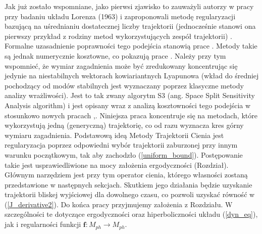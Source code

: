 \documentclass[12pt]{article}
\begin{document}
Jak już zostało wspomniane, jako pierwsi zjawisko to zauważyli autorzy w pracy \cite{Lea1} przy badaniu układu Lorenza (1963) i zaproponowali metodę regularyzacji bazującą na uśrednianiu dostatecznej liczby trajektorii (jednocześnie stanowi ona pierwszy przykład z rodziny metod wykorzystujących zespół trajektorii) \cite{Lea2}. Formalne uzasadnienie poprawności tego podejścia stanowią prace \cite{Ruelle1} . Metody takie są jednak numerycznie kosztowne, co pokazują prace \cite{Chandramoorthy}. Należy przy tym wspomnieć, że wymiar zagadnienia może być zredukowany koncentrując się jedynie na niestabilnych wektorach kowiariantnych Lyapunowa (wkład do średniej pochodzący od modów stabilnych jest wyznaczany poprzez klasyczne metody analizy wrażliwości). Jest to tak zwany algorytm S3 (ang. Space Split Sensitivity Analysis algorithm) i jest opisany wraz z analizą kosztowności tego podejścia w stosunkowo nowych pracach \cite{Chandramoorthy2},\cite{Chandramoorthy3}. Niniejsza praca koncentruje się na metodach, które wykorzystują jedną (generyczną) trajektorię, co od razu wyznacza kres górny wymiaru zagadnienia.\newline 
Podstawową ideą Metody Trajektorii Cienia jest regularyzacja poprzez odpowiedni wybór trajektorii zaburzonej przy innym warunku początkowym, tak aby zachodzło (\ref{uniform_bound}). Postępowanie takie jest usprawiedliwione na mocy założenia ergodyczności (Rozdział). Głównym narzędziem jest przy tym operator cienia, którego własności zostaną przedstawione w następnych sekcjach. Skutkiem jego działania będzie uzyskanie trajektorii bliskej wyjściowej dla dowolnego czasu, co pozwoli uzyskać równość w (\ref{J_derivative2}). \newline 
Do końca pracy przyjmujemy założenia z Rozdziału. W szczególności te dotyczące ergodyczności oraz hiperboliczności układu (\ref{dyn_eq}), jak i regularności funkcji $ \textbf{f}: M_{ph} \rightarrow M_{ph}$. 
\end{document}
